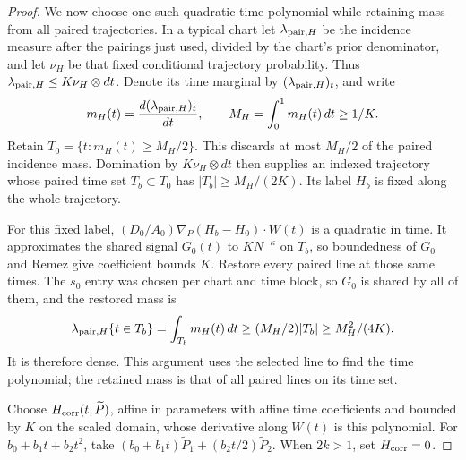 \begin{proof}
We now choose one such quadratic time polynomial while retaining
mass from all paired trajectories. In a typical chart let
\(\lambda_{{\rm pair},H}\) be the incidence measure after the
pairings just used, divided by the chart's prior denominator, and
let \(\nu_H\) be that fixed conditional trajectory probability.
Thus \(\lambda_{{\rm pair},H}\le K\nu_H\otimes dt\). Denote
its time marginal by \((\lambda_{{\rm pair},H})_t\), and write
\[
 m_H(t)=\frac{d(\lambda_{{\rm pair},H})_t}{dt},\qquad
 M_H=\int_0^1m_H(t)\,dt\ge1/K.
\]
Retain \(T_0=\{t:m_H(t)\ge M_H/2\}\). This discards at most
\(M_H/2\) of the paired incidence mass. Domination by
\(K\nu_H\otimes dt\) then supplies an indexed trajectory whose
paired time set \(T_b\subset T_0\) has
\(|T_b|\ge M_H/(2K)\). Its label \(H_b\) is fixed along the
whole trajectory.

For this fixed label,
\((D_0/A_0)\nabla_P(H_b-H_0)\cdot W(t)\) is a quadratic in
time. It approximates the shared signal \(G_0(t)\) to
\(KN^{-\kappa}\) on \(T_b\), so boundedness of \(G_0\) and
Remez give coefficient bounds \(K\). Restore every paired line
at those same times. The \(s_0\) entry was chosen per chart and
time block, so \(G_0\) is shared by all of them, and the restored
mass is
\[
 \lambda_{{\rm pair},H}\{t\in T_b\}
 =\int_{T_b}m_H(t)\,dt
 \ge (M_H/2)|T_b|\ge M_H^2/(4K).
\]
It is therefore dense. This argument uses the selected line to find
the time polynomial; the retained mass is that of all paired lines
on its time set.

Choose \(H_{\rm corr}(t,\widetilde P)\), affine in parameters
with affine time coefficients and bounded by \(K\) on the scaled
domain, whose derivative along \(W(t)\) is this polynomial.
For \(b_0+b_1t+b_2t^2\), take
\((b_0+b_1t)\widetilde P_1+(b_2t/2)\widetilde P_2\).
When \(2k>1\), set \(H_{\rm corr}=0\).


\end{proof}
